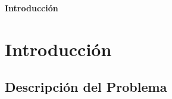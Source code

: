 \newpage{\pagestyle{empty}\cleardoublepage}
\newpage{\pagestyle{empty}\cleardoublepage}
\newpage
\vspace*{\fill}
    \begin{center}
      \thispagestyle{empty} \vspace*{0cm} \textbf{\huge
Introducci\'{o}n}
    \end{center}
    \vspace*{\fill}
\newpage{\pagestyle{empty}\cleardoublepage}
\chapter{Introducci\'{o}n}
\section{Descripci\'{o}n del Problema}


%
%
%
%
%

